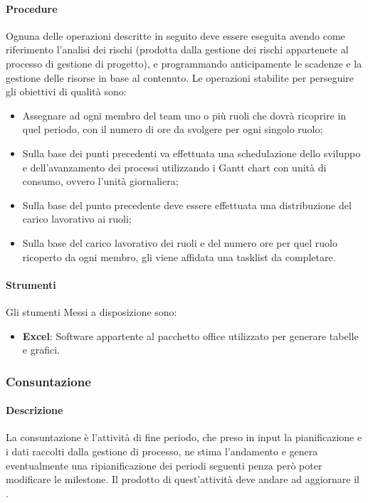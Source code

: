 \documentclass[../NormeDiProgetto_v3.0.0.tex]{subfiles}
\begin{document}
			\paragraph{Procedure}
				Ognuna delle operazioni descritte in seguito deve essere eseguita avendo come riferimento l'analisi dei rischi (prodotta dalla gestione dei rischi appartenete al processo di gestione di progetto), e programmando anticipamente le scadenze e la gestione delle risorse in base al contenuto.
				Le operazioni stabilite per perseguire gli obiettivi di qualità sono:
				\begin{itemize}
					\item Assegnare ad ogni membro del team uno o più ruoli che dovrà ricoprire in quel periodo, con il numero di ore da svolgere per ogni singolo ruolo;
					\item Sulla base dei punti precedenti va effettuata una schedulazione dello sviluppo e dell'avanzamento dei processi utilizzando i Gantt chart con unità di consumo, ovvero l'unità giornaliera;
					\item Sulla base del punto precedente deve essere effettuata una distribuzione del carico lavorativo ai ruoli;
					\item Sulla base del carico lavorativo dei ruoli e del numero ore per quel ruolo ricoperto da ogni membro, gli viene affidata una tasklist da completare.
				\end{itemize}

			\paragraph{Strumenti}
				Gli stumenti Messi a disposizione sono:
				\begin{itemize}
					\item \textbf{Excel}: Software appartente al pacchetto office utilizzato per generare tabelle e grafici. 
				\end{itemize}
				

		\subsubsection{Consuntazione}
			\paragraph{Descrizione}
				La consuntazione è l'attività di fine periodo, che preso in input la pianificazione e i dati raccolti dalla gestione di processo, ne stima l'andamento e genera eventualmente una ripianificazione dei periodi seguenti penza però poter modificare le milestone.
				Il prodotto di quest'attività deve andare ad aggiornare il \pianodiprogetto.
\end{document}
